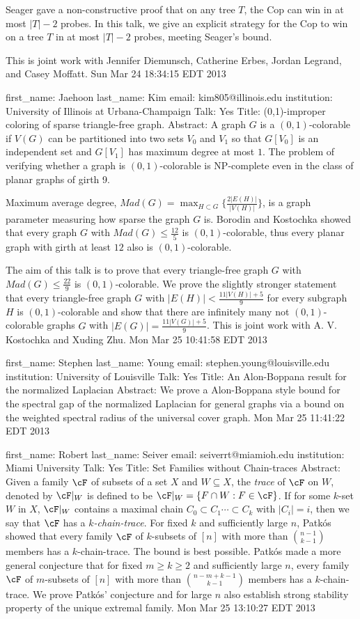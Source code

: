 \documentclass{article}
\begin{document}
Seager gave a non-constructive proof that on any tree $T$, the Cop can win in at most $|T|-2$ probes. In this talk, we give an explicit strategy for the Cop to win on a tree $T$ in at most $|T|-2$ probes, meeting Seager's bound.

This is joint work with Jennifer Diemunsch, Catherine Erbes, Jordan Legrand, and Casey Moffatt.
Sun Mar 24 18:34:15 EDT 2013

first_name: Jaehoon
last_name: Kim
email: kim805@illinois.edu
institution: University of Illinois at Urbana-Champaign
Talk: Yes
Title: (0,1)-improper coloring of sparse triangle-free graph.
Abstract: A graph $G$ is a $(0,1)$-colorable if $V(G)$ can be partitioned into two sets $V_0$ and $V_1$ so that $G[V_0]$ is an independent set and $G[V_1]$ has maximum degree at most $1$. The problem of verifying whether a graph is $(0,1)$-colorable is NP-complete even in the class of planar graphs of girth 9.

Maximum average degree, $Mad(G)= \max_{H\subset G}\{\frac{2|E(H)|}{|V(H)|}\}$, is a graph parameter measuring how sparse the  graph $G$ is. Borodin and Kostochka showed that every graph $G$ with $Mad(G)\leq \frac{12}{5}$ is $(0,1)$-colorable, thus every planar graph with girth at least $12$ also is $(0,1)$-colorable.

The aim of this talk is to prove that every triangle-free graph $G$ with $Mad(G)\leq \frac{22}{9}$ is $(0,1)$-colorable. We prove the slightly
stronger statement that every triangle-free graph $G$ with $|E(H)|<\frac{11|V(H)|+5}{9}$ for every subgraph $H$ is $(0,1)$-colorable and show that there are infinitely many not  $(0,1)$-colorable graphs $G$ with $|E(G)|=\frac{11|V(G)|+5}{9}$. This is joint work with A. V. Kostochka and Xuding Zhu.
Mon Mar 25 10:41:58 EDT 2013

first_name: Stephen
last_name: Young
email: stephen.young@louisville.edu
institution: University of Louisville
Talk: Yes
Title: An Alon-Boppana result for the normalized Laplacian
Abstract: We prove a Alon-Boppana style bound for the spectral gap of the normalized
Laplacian for general graphs via a bound on the weighted spectral radius of
the universal cover graph.
Mon Mar 25 11:41:22 EDT 2013

first_name: Robert
last_name: Seiver
email: seiverrt@miamioh.edu
institution: Miami University
Talk: Yes
Title: Set Families without Chain-traces
Abstract: Given a family $\cF$ of subsets of a set $X$ and $W\subseteq X$, the {\it trace} of $\cF$ on $W$, denoted by $\cF|_W$ is defined to be  $\cF|_W=\{F\cap W: F\in \cF\}$. If for some $k$-set $W$ in $X$,
$\cF|_W$ contains a maximal chain $C_0\subset C_1\cdots \subset C_k$ with $|C_i|=i$,
then we say that $\cF$ has a {\it $k$-chain-trace}. For fixed $k$ and sufficiently large $n$, Patk\'os  showed that every family $\cF$ of $k$-subsets of $[n]$ with more than $\binom{n-1}{k-1}$ members
has a $k$-chain-trace. The bound is best possible. Patk\'os made a more general conjecture
that for fixed $m\geq k\geq 2$ and sufficiently large $n$, every family $\cF$ of $m$-subsets of $[n]$ with
more than $\binom{n-m+k-1}{k-1}$ members has a $k$-chain-trace. We prove Patk\'os' conjecture and for large $n$ also establish strong stability property of the unique
extremal family.
Mon Mar 25 13:10:27 EDT 2013
\end{document}
